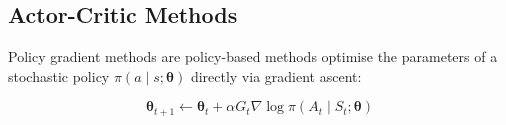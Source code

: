 \documentclass[12pt]{article}
\begin{document}



\subsection{Actor-Critic Methods}

Policy gradient methods are policy-based methods optimise the parameters of a stochastic policy $\pi(a \mid s; \bm{\theta})$ directly via gradient ascent:

\begin{equation}
	\bm{\theta}_{t+1} \leftarrow \bm{\theta}_t + \alpha G_t \nabla \log{\pi(A_t \mid S_t; \bm{\theta})}
\end{equation}
\end{document}
